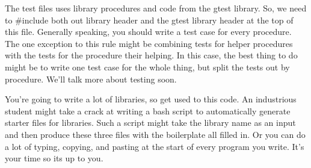 \documentclass[]{tufte-handout}
\begin{document}
The test files uses library procedures and code from the gtest library. So, we need to \#include both out library header and the gtest library header at the top of this file. Generally speaking, you should write a test case for every procedure. The one exception to this rule might be combining tests for helper procedures with the tests for the procedure their helping.  In this case, the best thing to do might be to write one test case for the whole thing, but split the tests out by procedure. We'll talk more about testing soon.

You're going to write a lot of libraries, so get used to this code. An industrious student might take a crack at writing a bash script to automatically generate starter files for libraries. Such a script might take the library name as an input and then produce these three files with the boilerplate all filled in. Or you can do a lot of typing, copying, and pasting at the start of every program you write. It's your time so its up to you.

 
\end{document}
